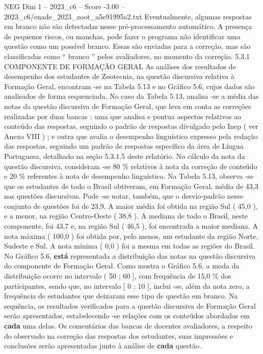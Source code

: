 \begin{textsample}{NEG Dim 1 – 2023\_c6 – Score -3.00 – 2023\_c6/enade\_2023\_zoot\_a5e91995a2.txt}
Eventualmente, algumas respostas em branco não são detectadas nesse pré-processamento automático.
A presença de pequenos riscos, ou manchas, pode fazer o programa não identificar uma questão como um possível branco.
Essas são enviadas para a correção, mas são classificadas como “ branco ” pelos avaliadores, no momento da correção. 5.3.1 COMPONENTE DE FORMAÇÃO GERAL As análises dos resultados de desempenho dos estudantes de Zootecnia, na questão discursiva relativa à Formação Geral, encontram -se na Tabela 5.13 e no Gráfico 5.6, cujos dados são analisados de forma sequenciada.
No caso da Tabela 5.13, analisa -se a média das notas da questão discursiva de Formação Geral, que leva em conta as correções realizadas por duas bancas : uma que analisa e pontua aspectos relativos ao conteúdo das respostas, seguindo o padrão de respostas divulgado pelo Inep ( ver Anexo VIII ) ; e outra que avalia o desempenho linguístico expresso pela redação das respostas, seguindo um padrão de respostas específico da área de Língua Portuguesa, detalhado na seção 5.3.1.5 deste relatório.
No cálculo da nota da questão discursiva, consideram -se 80 \% relativos à nota da correção de conteúdo e 20 \% referentes à nota de desempenho linguístico.
Na Tabela 5.13, observa -se que os estudantes de todo o Brasil obtiveram, em Formação Geral, média de 43,3 nas questões discursivas.
Pode -se notar, também, que o desvio-padrão nesse conjunto de questões foi de 23,9.
A maior média foi obtida na região Sul ( 45,0 ), e a menor, na região Centro-Oeste ( 38,8 ).
A mediana de todo o Brasil, neste componente, foi 43,7 e, na região Sul ( 46,5 ), foi encontrada a maior mediana.
A nota máxima ( 100,0 ) foi obtida por, pelo menos, um estudante da região Norte, Sudeste e Sul.
A nota mínima ( 0,0 ) foi a mesma em todas as regiões do Brasil.
No Gráfico 5.6, \textbf{está} representada a distribuição das notas na questão discursiva do componente de Formação Geral.
Como mostra o Gráfico 5.6, a moda da distribuição ocorre no intervalo ( 50 ; 60 ], com frequência de 15,0 \% dos participantes, sendo que, no intervalo [ 0 ; 10 ], inclui -se, além da nota zero, a frequência de estudantes que deixaram esse tipo de questão em branco.
Na sequência, os resultados verificados para a questão discursiva de Formação Geral serão apresentados, estabelecendo -se relações com os conteúdos abordados em \textbf{cada} uma delas.
Os comentários das bancas de docentes avaliadores, a respeito do observado na correção das respostas dos estudantes, suas impressões e conclusões serão apresentadas junto à análise de \textbf{cada} questão.

\end{textsample}
